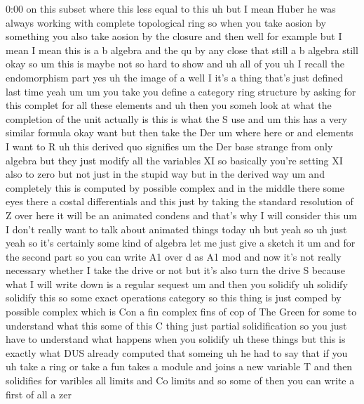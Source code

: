 \begin{unfinished}{0:00}
on  this  subset  where  this  less  equal  to
this  uh  but  I  mean  Huber  he  was  always
working  with  complete  topological  ring
so  when  you  take  aosion  by  something  you
also  take
aosion  by  the  closure  and
then  well  for  example  but  I  mean  I  mean
this  is  a  b  algebra  and  the  qu  by  any
close  that  still  a  b  algebra
still
okay  so
um  this  is  maybe  not  so  hard  to  show  and
uh  all  of
you  uh  I  recall  the
endomorphism  part
yes
uh  the  image  of
a  well  I  it's  a  thing  that's  just
defined  last  time  yeah
um  um  you
take  you  define  a
category  ring  structure  by  asking  for
this  complet  for  all  these
elements  and  uh  then  you  someh  look  at
what  the  completion  of  the  unit  actually
is  this  is  what  the  S  use  and  um  this
has  a  very  similar
formula  okay  want
but  then  take  the
Der  um  where
here
or  and  elements  I  want  to
R
uh  this  derived  quo
signifies  um  the  Der  base
strange
from  only
algebra  but  they  just  modify  all
the  variables  XI  so  basically  you're
setting  XI  also  to  zero  but  not  just  in
the  stupid  way  but  in  the  derived  way  um
and  completely  this  is  computed  by
possible
complex  and  in  the  middle  there  some
eyes  there  a  costal  differentials
and  this  just  by  taking  the  standard
resolution
of  Z  over
here  it  will  be  an  animated
condens  and  that's  why  I  will  consider
this  um  I  don't  really  want  to  talk
about  animated  things  today  uh  but  yeah
so
uh
just  yeah  so  it's  certainly  some  kind
of
algebra
let  me  just  give  a  sketch
it  um  and  for  the  second  part  so  you  can
write  A1  over  d  as
A1  mod  and  now  it's  not  really  necessary
whether  I  take  the  drive  or  not  but  it's
also  turn  the  drive  S  because  what  I
will  write  down  is  a  regular
sequest
um
and  then  you
solidify
uh
solidify  solidify
this  so  some  exact  operations  category
so  this  thing  is  just  comped  by  possible
complex  which  is  Con  a  fin  complex  fins
of  cop  of  The  Green  for  some  to
understand  what  this  some  of  this  C
thing  just  partial  solidification  so  you
just  have  to  understand  what  happens
when  you
solidify  uh  these  things  but  this  is
exactly  what  DUS  already  computed  that
someing
uh  he  had  to  say  that  if  you  uh  take  a
ring  or  take  a  fun  takes  a  module  and
joins  a  new  variable  T  and  then
solidifies  for  varibles  all  limits  and
Co  limits  and  so  some  of  then  you  can
write
a  first  of  all  a  zer

\end{unfinished}
